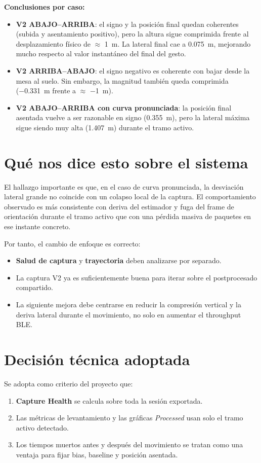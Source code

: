 ﻿\documentclass[11pt,a4paper]{article}
\begin{document}
\textbf{Conclusiones por caso:}
\begin{itemize}[leftmargin=14pt]
  \item \textbf{V2 ABAJO--ARRIBA}: el signo y la posici\'on final quedan coherentes (subida y asentamiento positivo), pero la altura sigue comprimida frente al desplazamiento f\'isico de \(\approx\) \SI{1}{m}. La lateral final cae a \SI{0,075}{m}, mejorando mucho respecto al valor instant\'aneo del final del gesto.
  \item \textbf{V2 ARRIBA--ABAJO}: el signo negativo es coherente con bajar desde la mesa al suelo. Sin embargo, la magnitud tambi\'en queda comprimida (\SI{-0,331}{m} frente a \(\approx\) \SI{-1}{m}).
  \item \textbf{V2 ABAJO--ARRIBA con curva pronunciada}: la posici\'on final asentada vuelve a ser razonable en signo (\SI{0,355}{m}), pero la lateral m\'axima sigue siendo muy alta (\SI{1,407}{m}) durante el tramo activo.
\end{itemize}

\section{Qu\'e nos dice esto sobre el sistema}
El hallazgo importante es que, en el caso de curva pronunciada, la desviaci\'on lateral grande no coincide con un colapso local de la captura. El comportamiento observado es m\'as consistente con deriva del estimador y fuga del frame de orientaci\'on durante el tramo activo que con una p\'erdida masiva de paquetes en ese instante concreto.

Por tanto, el cambio de enfoque es correcto:
\begin{itemize}[leftmargin=14pt]
  \item \textbf{Salud de captura} y \textbf{trayectoria} deben analizarse por separado.
  \item La captura V2 ya es suficientemente buena para iterar sobre el postprocesado compartido.
  \item La siguiente mejora debe centrarse en reducir la compresi\'on vertical y la deriva lateral durante el movimiento, no solo en aumentar el throughput BLE.
\end{itemize}

\section{Decisi\'on t\'ecnica adoptada}
Se adopta como criterio del proyecto que:
\begin{enumerate}[leftmargin=16pt]
  \item \textbf{Capture Health} se calcula sobre toda la sesi\'on exportada.
  \item Las m\'etricas de levantamiento y las gr\'aficas \emph{Processed} usan solo el tramo activo detectado.
  \item Los tiempos muertos antes y despu\'es del movimiento se tratan como una ventaja para fijar bias, baseline y posici\'on asentada.
\end{enumerate}
\end{document}
